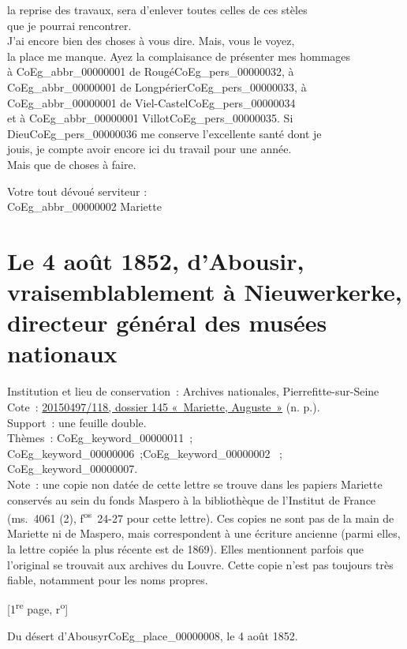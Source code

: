 \documentclass{book}
\begin{document}
la reprise des travaux, sera d’enlever toutes celles de ces stèles\\
que je pourrai rencontrer.\\
\indent J’ai encore bien des choses à vous dire. Mais, vous le voyez,\\
la place me manque. Ayez la complaisance de présenter mes hommages\\
à \gls{CoEg_abbr_00000001} de Rougé\gls{CoEg_pers_00000032}, à \gls{CoEg_abbr_00000001} de Longpérier\gls{CoEg_pers_00000033}, à \gls{CoEg_abbr_00000001} de Viel-Castel\gls{CoEg_pers_00000034}\\
et à \gls{CoEg_abbr_00000001} Villot\gls{CoEg_pers_00000035}. Si Dieu\gls{CoEg_pers_00000036} me conserve l’excellente santé dont je\\
jouis, je compte avoir encore ici du travail pour une année.\\
\indent Mais que de choses à faire.
\begin{center} \hspace{5cm} Votre tout dévoué serviteur :\\
\hspace{5cm} \gls{CoEg_abbr_00000002} Mariette\end{center}

\hypertarget{CoEg_Mariette_1852-08-04}{}
\section*{Le 4 août 1852, d’Abousir, vraisemblablement à Nieuwerkerke, directeur général des musées nationaux}
{\footnotesize \noindent Institution et lieu de conservation~: Archives nationales, Pierrefitte-sur-Seine\\
Cote~: \hyperlink{CoEg_Mariette_ms_001}{20150497/118, dossier 145 «~Mariette, Auguste~»} (n. p.).\\
Support~: une feuille double.\\
Thèmes~: \gls{CoEg_keyword_00000011}~; \gls{CoEg_keyword_00000006}~;\gls{CoEg_keyword_00000002} ~; \gls{CoEg_keyword_00000007}.\\
Note~: une copie non datée de cette lettre se trouve dans les papiers Mariette conservés au sein du fonds Maspero à la bibliothèque de l’Institut de France (ms.~4061 (2), f\textsuperscript{os}~24-27 pour cette lettre). Ces copies ne sont pas de la main de Mariette ni de Maspero, mais correspondent à une écriture ancienne (parmi elles, la lettre copiée la plus récente est de 1869). Elles mentionnent parfois que l’original se trouvait aux archives du Louvre. Cette copie n’est pas toujours très fiable, notamment pour les noms propres.
\begin{center} {[1\textsuperscript{re} page, r\textsuperscript{o}]}\end{center}}
\begin{flushright} Du désert d’Abousyr\gls{CoEg_place_00000008}, le 4 août 1852.\end{flushright}
\end{document}
